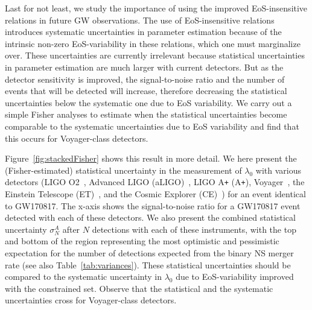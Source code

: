 \documentclass[prd,twocolumn,nofootinbib,superscriptaddress,amsmath,amssymb]{revtex4-1}
\begin{document}
Last for not least, we study the importance of using the improved EoS-insensitive relations in future GW observations. The use of EoS-insensitive relations introduces systematic uncertainties in parameter estimation because of the intrinsic non-zero EoS-variability in these relations, which one must marginalize over. These uncertainties are currently irrelevant because statistical uncertainties in parameter estimation are much larger with current detectors. But as the detector sensitivity is improved, the signal-to-noise ratio and the number of events that will be detected will increase, therefore decreasing the statistical uncertainties below the systematic one due to EoS variability. We carry out a simple Fisher analyses to estimate when the statistical uncertainties become comparable to the systematic uncertainties due to EoS variability and find that this occurs for Voyager-class detectors. 

Figure~\ref{fig:stackedFisher} shows this result in more detail. We here present the (Fisher-estimated) statistical uncertainty in the measurement of $\lambda_{0}$ with various detectors (LIGO O2~\cite{aLIGO}, Advanced LIGO (aLIGO)~\cite{aLIGO}, LIGO A\texttt{+} (A\texttt{+})\cite{Ap_Voyager_CE}, Voyager~\cite{Ap_Voyager_CE}, the Einstein Telescope (ET)~\cite{ET}, and the Cosmic Explorer (CE)~\cite{Ap_Voyager_CE}) for an event identical to GW170817. The x-axis shows the signal-to-noise ratio for a GW170817 event detected with each of these detectors. We also present the combined statistical uncertainty $\sigma^A_N$ after $N$ detections with each of these instruments, with the top and bottom of the region representing the most optimistic and pessimistic expectation for the number of detections expected from the binary NS merger rate (see also Table~\ref{tab:variances}). These statistical uncertainties should be compared to the systematic uncertainty in $\lambda_{0}$ due to EoS-variability improved with the constrained set. Observe that the statistical and the systematic uncertainties cross for Voyager-class detectors.
\end{document}
